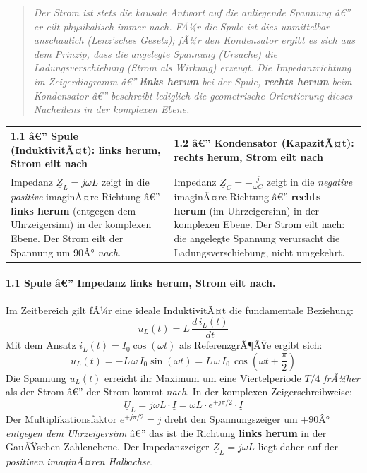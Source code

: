 ﻿\documentclass[12pt,a4paper,titlepage]{report}
\begin{document}
\begin{quote}
\itshape
Der Strom ist stets die kausale Antwort auf die anliegende Spannung â€”
er eilt physikalisch immer nach.
FÃ¼r die Spule ist dies unmittelbar anschaulich (Lenz'sches Gesetz);
fÃ¼r den Kondensator ergibt es sich aus dem Prinzip, dass die angelegte Spannung
(Ursache) die Ladungsverschiebung (Strom als Wirkung) erzeugt.
Die Impedanzrichtung im Zeigerdiagramm â€” \textbf{links herum} bei der Spule,
\textbf{rechts herum} beim Kondensator â€” beschreibt lediglich die
\emph{geometrische Orientierung} dieses Nacheilens in der komplexen Ebene.
\end{quote}

\begin{center}
\renewcommand{\arraystretch}{1.4}
\begin{tabular}{p{7.5cm} p{7.5cm}}
\toprule
\textbf{1.1 â€” Spule (InduktivitÃ¤t): links herum, Strom eilt nach}
& \textbf{1.2 â€” Kondensator (KapazitÃ¤t): rechts herum, Strom eilt nach} \\
\midrule
Impedanz $\underline{Z}_L = j\omega L$ zeigt in die \emph{positive} imaginÃ¤re
Richtung â€” \textbf{links herum} (entgegen dem Uhrzeigersinn) in der
komplexen Ebene. Der Strom eilt der Spannung um $90Â°$ \emph{nach}.
& Impedanz $\underline{Z}_C = -\tfrac{j}{\omega C}$ zeigt in die
\emph{negative} imaginÃ¤re Richtung â€” \textbf{rechts herum} (im Uhrzeigersinn)
in der komplexen Ebene. Der Strom eilt nach:
die angelegte Spannung verursacht die Ladungsverschiebung, nicht umgekehrt. \\
\bottomrule
\end{tabular}
\end{center}

\paragraph{1.1 \quad Spule â€” Impedanz links herum, Strom eilt nach.}

Im Zeitbereich gilt fÃ¼r eine ideale InduktivitÃ¤t die fundamentale Beziehung:
\[
	u_L(t) = L\,\frac{d\,i_L(t)}{dt}
\]
Mit dem Ansatz $i_L(t) = I_0\cos(\omega t)$ als ReferenzgrÃ¶ÃŸe ergibt sich:
\[
	u_L(t) = -L\,\omega\,I_0 \sin(\omega t) = L\,\omega\,I_0\,\cos\!\left(\omega t + \frac{\pi}{2}\right)
\]
Die Spannung $u_L(t)$ erreicht ihr Maximum um eine Viertelperiode $T/4$ \emph{frÃ¼her}
als der Strom â€” der Strom kommt \emph{nach}. In der komplexen Zeigerschreibweise:
\[
	\underline{U}_L = j\omega L \cdot \underline{I} = \omega L \cdot e^{+j\pi/2} \cdot \underline{I}
\]
Der Multiplikationsfaktor $e^{+j\pi/2} = j$ dreht den Spannungszeiger um $+90Â°$
\emph{entgegen dem Uhrzeigersinn} â€” das ist die Richtung \textbf{links herum} in der
GauÃŸschen Zahlenebene. Der Impedanzzeiger $\underline{Z}_L = j\omega L$ liegt daher auf der
\emph{positiven imaginÃ¤ren Halbachse}.
\end{document}
